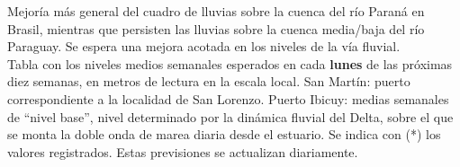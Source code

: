 Mejoría más general del cuadro de lluvias sobre la cuenca del río Paraná
en Brasil, mientras que persisten las lluvias sobre la cuenca media/baja
del río Paraguay. Se espera una mejora acotada en los niveles de la vía
fluvial.\\
Tabla con los niveles medios semanales esperados en cada
{\textbf{lunes}} \textbf{} de las próximas diez semanas, en metros de
lectura en la escala local. San Martín: puerto correspondiente a la
localidad de San Lorenzo. Puerto Ibicuy: medias semanales de ``nivel
base'', nivel determinado por la dinámica fluvial del Delta, sobre el
que se monta la doble onda de marea diaria desde el estuario. Se indica
con (*) los valores registrados. Estas previsiones se actualizan
diariamente.
